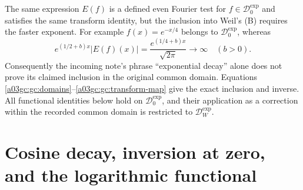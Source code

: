 The same expression $E(f)$ is a defined even Fourier test for
$f\in\mathcal D_0^{\exp}$ and satisfies the same transform identity,
but the inclusion into Weil's (B) requires the faster exponent.
For example $f(x)=e^{-x/4}$ belongs to $\mathcal D_0^{\exp}$, whereas
\begin{equation}
 e^{(1/2+b)x}|E(f)(x)|
   =\frac{e^{(1/4+b)x}}{\sqrt{2\pi}}\longrightarrow\infty
   \quad (b>0).
 \label{a03gc:gc:domain-counterexample}
\end{equation}
Consequently the incoming note's phrase ``exponential decay'' alone does
not prove its claimed inclusion in the original common domain.  Equations
\eqref{a03gc:gc:domains}--\eqref{a03gc:gc:transform-map} give the exact inclusion and
inverse.  All functional identities below hold on
$\mathcal D_0^{\exp}$, and their application as a correction within the
recorded common domain is restricted to $\mathcal D_W^{\exp}$.

\section{Cosine decay, inversion at zero, and the logarithmic functional}


